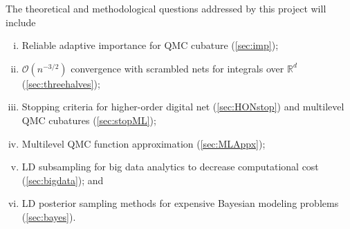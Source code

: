 \documentclass[11pt]{NSFamsart}
\newcommand{\cmtS}[1]{{\color{blue}{(Simon: #1)}}}
\newcommand{\SEC}{Sect.\xspace}
\newcommand{\reals}{{\mathbb{R}}}
\newcommand{\Order}{\mathcal{O}}
\begin{document}

The theoretical and methodological questions addressed by this project will include \cmtS{to modify, move later into \SEC 1? and have this has a one-paragraph abstract on the overarching framework \& broader impacts?}
\begin{enumerate}[i)]
\item Reliable adaptive importance for QMC cubature (\cref{sec:imp});
\item $\Order(n^{-3/2})$ convergence with scrambled nets for integrals over $\reals^d$ (\cref{sec:threehalves});
\item Stopping criteria for higher-order digital net (\cref{sec:HONstop}) and multilevel QMC cubatures (\cref{sec:stopML});
\item Multilevel QMC function approximation (\cref{sec:MLAppx});
\item LD subsampling for big data analytics to decrease computational cost (\cref{sec:bigdata}); and
\item LD posterior sampling methods for expensive Bayesian modeling problems (\cref{sec:bayes}).
\end{enumerate}
\end{document}
